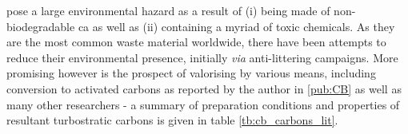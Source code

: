  pose a large environmental hazard as a result of (i) being made of non-biodegradable \acrfull{ca} as well as (ii) containing a myriad of toxic chemicals.\citep{Slaughter2011, Puls2011, chevalier2018nano} As they are the most common waste material worldwide, there have been attempts to reduce their environmental presence, initially \textit{via} anti-littering campaigns.\citep{Prevention2011, Harris2011} More promising however is the prospect of valorising  by various means, including conversion to activated carbons as reported by the author in \ref{pub:CB} as well as many other researchers - a summary of preparation conditions and properties of resultant \glspl{turbostratic carbon} is given in table \ref{tb:cb_carbons_lit}.\citep{Soltani, Soltani2013, lima2018, xiong2019nitrogen, Lee2014, Hamzah2017, Yu2018, Wang2016a, Koochaki2019, Bilge2019}

